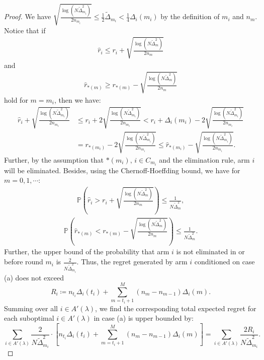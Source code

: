 \documentclass[11pt]{article}
\begin{document}
\begin{proof}
We have  \( \sqrt{\frac{\log(N \tilde{\Delta}_{m_i}^2)}{2n_{m_i}}} \leq \frac{1}{2}\tilde{\Delta}_{m_i} < \frac{1}{4}\Delta_i(m_i) \) by the definition of $m_i$ and $n_m$. Notice that if
\begin{align}
    \hat{r}_i \leq r_i + \sqrt{\frac{\log(N \tilde{\Delta}_{m}^2)}{2n_{m}}} \label{suboptimal is bad}
\end{align}
and  
\begin{align}
    \hat{r}_{*(m)} \geq r_{*(m)} - \sqrt{\frac{\log(N \tilde{\Delta}_{m}^2)}{2n_{m}}} \label{optimal is good}
\end{align}
hold for $m = m_i$, then we have:  
\begin{align*}
    \hat{r}_i + \sqrt{\frac{\log(N \tilde{\Delta}_{m_i}^2)}{2n_{m_i}}} &\leq r_i + 2\sqrt{\frac{\log(N \tilde{\Delta}_{m_i}^2)}{2n_{m_i}}} < r_i + \Delta_i(m_i) - 2\sqrt{\frac{\log(N \tilde{\Delta}_{m_i}^2)}{2n_{m_i}}} \\
    &= r_{*(m_i)} - 2\sqrt{\frac{\log(N \tilde{\Delta}_{m_i}^2)}{2n_{m_i}}} \leq \hat{r}_{*(m_i)} - \sqrt{\frac{\log(N \tilde{\Delta}_{m_i}^2)}{2n_{m_i}}}.
\end{align*}
Further, by the assumption that $*(m_i),\, i \in C_{m_i}$ and the elimination rule, arm \( i \) will be eliminated. Besides, using the Chernoff-Hoeffding bound, we have for $m=0,1,\cdots$:
\begin{align}
    \mathbb{P}\left( \hat{r}_i > r_i + \sqrt{\frac{\log(N \tilde{\Delta}_{m}^2)}{2n_{m}}} \right) \leq \frac{1}{N \tilde{\Delta}_{m}^2},
\end{align}
\begin{align}
    \mathbb{P}\left( \hat{r}_{*(m)} < r_{*(m)} - \sqrt{\frac{\log(N \tilde{\Delta}_{m}^2)}{2n_{m}}} \right) \leq \frac{1}{N \tilde{\Delta}_{m}^2} .
\end{align}
Further, the upper bound of the probability that arm \( i \) is not eliminated in or before round $m_i$ is \( \frac{2}{N \tilde{\Delta}_{m_i}^2} \). Thus, the regret generated by arm \( i \) conditioned on case (a) does not exceed
\[
R_i \coloneqq  n_{t_i}\Delta_i(t_i) + \sum_{m = t_i + 1}^{M} (n_m - n_{m-1})\Delta_i(m).
\]
Summing over all $i\in A'(\lambda)$, we find the corresponding total expected regret for each suboptimal $i\in A'(\lambda)$ in case (a) is upper bounded by:
\[\sum_{i\in A'(\lambda)}\frac{2}{N \tilde{\Delta}_{m_i}^2}\cdot\left[n_{t_i}\Delta_i(t_i) + \sum_{m = t_i + 1}^{M} (n_m - n_{m-1})\Delta_i(m)\right]=\sum_{i\in A'(\lambda)}\frac{2R_i}{N\tilde{\Delta}_{m_i}^2}.\]


\end{proof}
\end{document}
